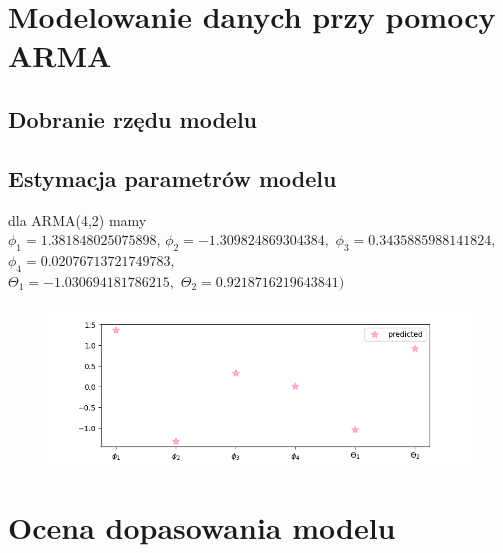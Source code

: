 \documentclass[12pt]{article}
\begin{document}
\section{Modelowanie danych przy pomocy ARMA}
\subsection{Dobranie rzędu modelu}
\subsection{Estymacja parametrów modelu}
dla ARMA(4,2) mamy \\
$\phi_1 = 1.381848025075898$, 
$\phi_2 = -1.309824869304384,$  
$\phi_3 = 0.3435885988141824,$ 
$\phi_4 = 0.02076713721749783,$ \\
$\Theta_1 = -1.030694181786215,$ 
$\Theta_2 =  0.9218716219643841)$ \\
\begin{figure}[!htbp]
    \centering
    \includegraphics[scale=0.70]{params42.png}
    \label{fig:enter-label}
\end{figure}

\section{Ocena dopasowania modelu}
\end{document}
